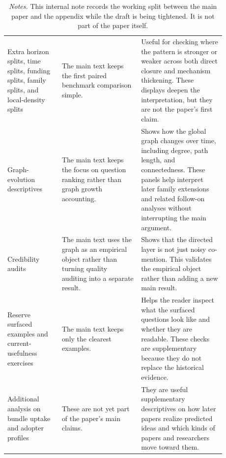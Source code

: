 \documentclass[11pt]{article}
\newcommand{\fignotes}[1]{\caption*{\textit{Notes.} #1}}
\begin{document}
\begin{table}[h]
\begin{tabular}{L{0.22\linewidth}L{0.32\linewidth}L{0.34\linewidth}}
    Extra horizon splits, time splits, funding splits, family splits, and local-density splits & The main text keeps the first paired benchmark comparison simple. & Useful for checking where the pattern is stronger or weaker across both direct closure and mechanism thickening. These displays deepen the interpretation, but they are not the paper's first claim. \\
    Graph-evolution descriptives & The main text keeps the focus on question ranking rather than graph growth accounting. & Shows how the global graph changes over time, including degree, path length, and connectedness. These panels help interpret later family extensions and related follow-on analyses without interrupting the main argument. \\
    Credibility audits & The main text uses the graph as an empirical object rather than turning quality auditing into a separate result. & Shows that the directed layer is not just noisy co-mention. This validates the empirical object rather than adding a new main result. \\
    Reserve surfaced examples and current-usefulness exercises & The main text keeps only the clearest examples. & Helps the reader inspect what the surfaced questions look like and whether they are readable. These checks are supplementary because they do not replace the historical evidence. \\
    Additional analysis on bundle uptake and adopter profiles & These are not yet part of the paper's main claims. & They are useful supplementary descriptives on how later papers realize predicted ideas and which kinds of papers and researchers move toward them. \\
    \bottomrule
  \end{tabular}
  \fignotes{This internal note records the working split between the main paper and the appendix while the draft is being tightened. It is not part of the paper itself.}
\end{table}
\end{document}
